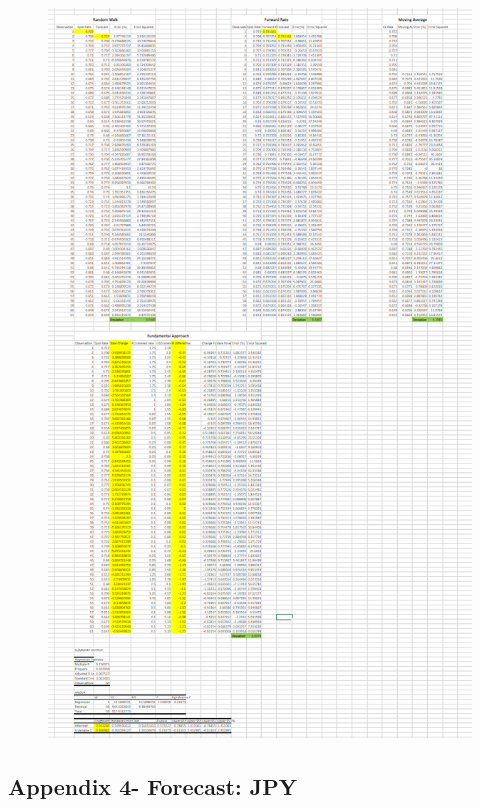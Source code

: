 \documentclass{article}
\let\Oldsubsection\subsection
\renewcommand{\subsection}{\FloatBarrier\Oldsubsection}
\begin{document}
\begin{figure}[h!]
    \centering
    \includegraphics[scale=0.5]{forecasts/USD.png}
\end{figure}

\break

\subsection*{Appendix 4- Forecast: JPY}
\end{document}
